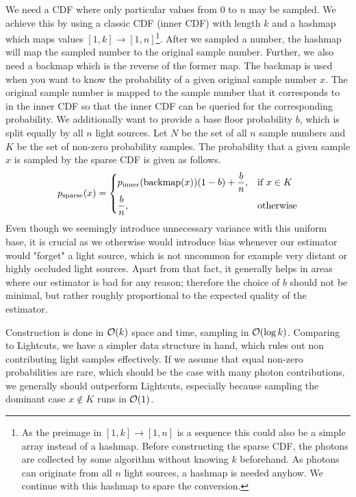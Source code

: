 We need  a CDF where only particular values from $0$ to $n$ may be sampled. We achieve this by using a classic CDF (inner CDF) with length $k$ and a hashmap which maps values $[1,k]\to [1,n]$\footnote{As the preimage in $[1,k]\to [1,n]$ is a sequence this could also be a simple array instead of a hashmap. Before constructing the sparse CDF, the photons are collected by some algorithm without knowing $k$ beforehand. As photons can originate from all $n$ light sources, a hashmap is needed anyhow. We continue with this hashmap to spare the conversion.}. After we sampled a number, the hashmap will map the sampled number to the original sample number. Further, we also need a backmap which is the reverse of the former map. The backmap is used when you want to know the probability of a given original sample number $x$. The original sample number is mapped to the sample number that it corresponds to in the inner CDF so that the inner CDF can be queried for the corresponding probability. We additionally want to provide a base floor probability $b$, which is split equally by all $n$ light sources. Let $N$ be the set of all $n$ sample numbers and $K$ be the set of non-zero probability samples. The probability that a given sample $x$ is sampled by the sparse CDF is given as follows.
\begin{align}\label{eq:psparse}
 p_{\text{sparse}}(x) = 
\begin{dcases}
    p_{\text{inner}}(\text{backmap}(x))(1 - b) + \frac{b}{n},& \text{if } x \in K\\
    \frac{b}{n}, & \text{otherwise}
\end{dcases}
\end{align}
Even though we seemingly introduce unnecessary variance with this uniform base, it is crucial as we otherwise would introduce bias whenever our estimator would "forget" a light source, which is not uncommon for example very distant or highly occluded light sources. Apart from that fact, it generally helps in areas where our estimator is bad for any reason; therefore the choice of $b$ should not be minimal, but rather roughly proportional to the expected quality of the estimator.

Construction is done in $\mathcal{O}(k)$ space and time, sampling in $\mathcal{O}(\log{k})$. Comparing to Lightcuts, we have a simpler data structure in hand, which rules out non contributing light samples effectively. If we assume that equal non-zero probabilities are rare, which should be the case with many photon contributions, we generally should outperform Lightcuts, especially because sampling the dominant case $x \notin K$ runs in $\mathcal{O}(1)$. 

